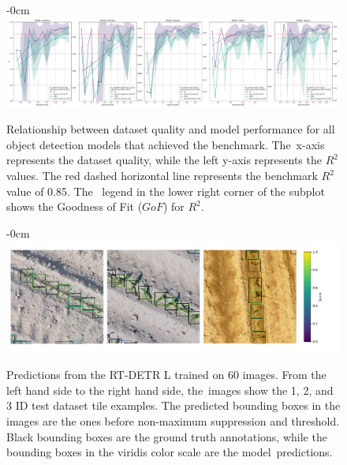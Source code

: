 \documentclass[12pt,a4paper,oneside]{report}
\newlength{\extralength}
\begin{document}
\begin{landscape}
\begin{figure}
  \begin{adjustwidth}{-\extralength}{0cm}
  \centering
  \includegraphics[width=22cm]{Plots/r2_ap_vs_dataset_quality.pdf}
  \end{adjustwidth}   
   \caption{Relationship between dataset quality and model performance for all object detection models
  that achieved the benchmark. The~x-axis represents the dataset quality, while 
  the left y-axis represents the $R^2$ values.
  The red dashed horizontal line represents the benchmark $R^2$ value of 0.85. The~  legend in the lower right corner of the subplot shows the Goodness of Fit ($GoF$) for $R^2$.}
  \label{fig:dataset_quality}
\end{figure}
\end{landscape}

\begin{landscape}
\begin{figure}
  \begin{adjustwidth}{-\extralength}{0cm}
  \centering
  \includegraphics[width=22cm]{Plots/many_shot_size_annotations.pdf}
  \end{adjustwidth}
  \vspace{-12pt}\caption{Predictions from the RT-DETR L trained on 60 images.
  From the left hand side to the right hand side, the~images show the
  1, 2, and 3 ID test dataset tile examples.
  The predicted bounding boxes in the images are the ones before 
  non-maximum suppression and threshold.
   Black bounding boxes are the ground truth annotations, while the bounding boxes 
   in the viridis color scale are the model~predictions.}
  \label{fig:annotations_many-shots_size}
\end{figure}
\end{landscape}
\end{document}

